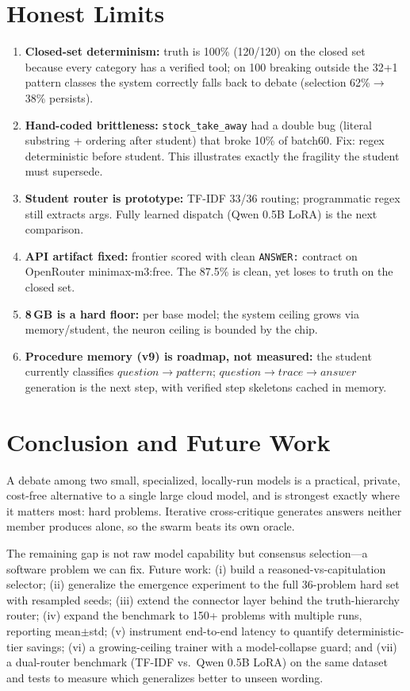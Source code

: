 \documentclass[conference,compsoc]{IEEEtran}
\begin{document}
\section{Honest Limits}
\begin{enumerate}
\item \textbf{Closed-set determinism:} truth is 100\% (120/120) on the closed set because every category has a verified tool; on 100 breaking outside the 32+1 pattern classes the system correctly falls back to debate (selection 62\%$\rightarrow$38\% persists).
\item \textbf{Hand-coded brittleness:} \texttt{stock\_take\_away} had a double bug (literal substring + ordering after student) that broke 10\% of batch60. Fix: regex deterministic before student. This illustrates exactly the fragility the student must supersede.
\item \textbf{Student router is prototype:} TF-IDF 33/36 routing; programmatic regex still extracts args. Fully learned dispatch (Qwen 0.5B LoRA) is the next comparison.
\item \textbf{API artifact fixed:} frontier scored with clean \texttt{ANSWER:} contract on OpenRouter minimax-m3:free. The 87.5\% is clean, yet loses to truth on the closed set.
\item \textbf{8\,GB is a hard floor:} per base model; the system ceiling grows via memory/student, the neuron ceiling is bounded by the chip.
\item \textbf{Procedure memory (v9) is roadmap, not measured:} the student currently classifies $question \rightarrow pattern$; $question \rightarrow trace \rightarrow answer$ generation is the next step, with verified step skeletons cached in memory.
\end{enumerate}

\section{Conclusion and Future Work}
A debate among two small, specialized, locally-run models is a practical, private, cost-free alternative to a single large cloud model, and is strongest exactly where it matters most: hard problems. Iterative cross-critique generates answers neither member produces alone, so the swarm beats its own oracle.

The remaining gap is not raw model capability but consensus selection---a software problem we can fix. Future work: (i) build a reasoned-vs-capitulation selector; (ii) generalize the emergence experiment to the full 36-problem hard set with resampled seeds; (iii) extend the connector layer behind the truth-hierarchy router; (iv) expand the benchmark to 150+ problems with multiple runs, reporting mean$\pm$std; (v) instrument end-to-end latency to quantify deterministic-tier savings; (vi) a growing-ceiling trainer with a model-collapse guard; and (vii) a dual-router benchmark (TF-IDF vs.\ Qwen 0.5B LoRA) on the same dataset and tests to measure which generalizes better to unseen wording.
\end{document}
